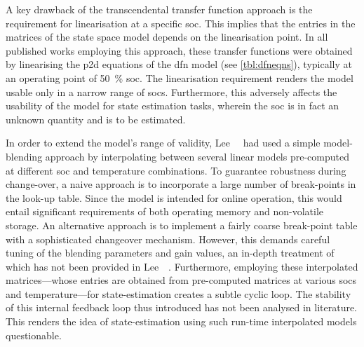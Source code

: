 A  key  drawback  of  the  transcendental  transfer  function  approach  is  the
requirement for  linearisation at  a specific \gls{soc}.  This implies  that the
entries in  the matrices of the  state space model depends  on the linearisation
point. In all published works  employing this approach, these transfer functions
were  obtained by  linearising the  \gls{p2d} equations  of the  \gls{dfn} model
(see \cref{tbl:dfneqns}), typically  at an operating point  of \SI{50}{\percent}
\gls{soc}.  The linearisation  requirement renders  the model  usable only  in a
narrow range of  \glspl{soc}. Furthermore, this adversely  affects the usability
of the  model for state  estimation tasks, wherein the  \gls{soc} is in  fact an
unknown quantity and is to be estimated.


In order to extend the model's range of validity, Lee~\etal{}~\cite{Lee2014} had
used a  simple model-blending approach  by interpolating between  several linear
models  pre-computed at  different  \gls{soc} and  temperature combinations.  To
guarantee robustness  during change-over, a  naive approach is to  incorporate a
large  number  of  break-points  in  the  look-up  table.  Since  the  model  is
intended  for  online  operation,  this would  entail  significant  requirements
of  both operating  memory  and non-volatile  storage.  An alternative  approach
is  to  implement  a  fairly  coarse  break-point  table  with  a  sophisticated
changeover  mechanism. However,  this  demands careful  tuning  of the  blending
parameters  and  gain values,  an  in-depth  treatment  of  which has  not  been
provided in Lee~\etal~\cite{Lee2014}.  Furthermore, employing these interpolated
matrices---whose  entries are  obtained  from pre-computed  matrices at  various
\glspl{soc} and temperature---for state-estimation creates a subtle cyclic loop.
The  stability of  this  internal feedback  loop thus  introduced  has not  been
analysed in  literature. This  renders the idea  of state-estimation  using such
run-time interpolated models questionable.


